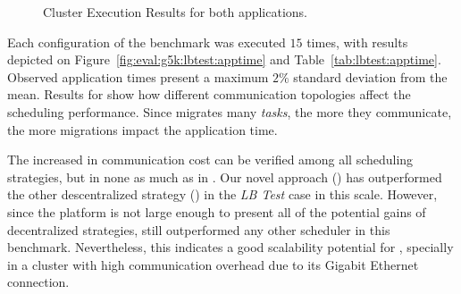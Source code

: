 \begin{figure}
	\centering
	\caption{Cluster Execution Results for both applications.}
	\label{fofinho3}
\end{figure}


Each configuration of the benchmark was executed $15$ times, with results depicted on Figure~\ref{fig:eval:g5k:lbtest:apptime} and Table~\ref{tab:lbtest:apptime}.
Observed application times present a maximum $2\%$ standard deviation from the mean. 
Results for \greedylb show how different communication topologies affect the scheduling performance.
Since \greedylb migrates many \textit{tasks}, the more they communicate, the more migrations impact the application time.

The increased in communication cost can be verified among all scheduling strategies, but in none as much as in \greedylb.
Our novel approach (\packdrop) has outperformed the other descentralized strategy (\distributedlb) in the \textit{LB Test} case in this scale.
However, since the platform is not large enough to present all of the potential gains of decentralized strategies,  still outperformed any other scheduler in this benchmark.
Nevertheless, this indicates a good scalability potential for \packdrop, specially in a cluster with high communication overhead due to its Gigabit Ethernet connection.

